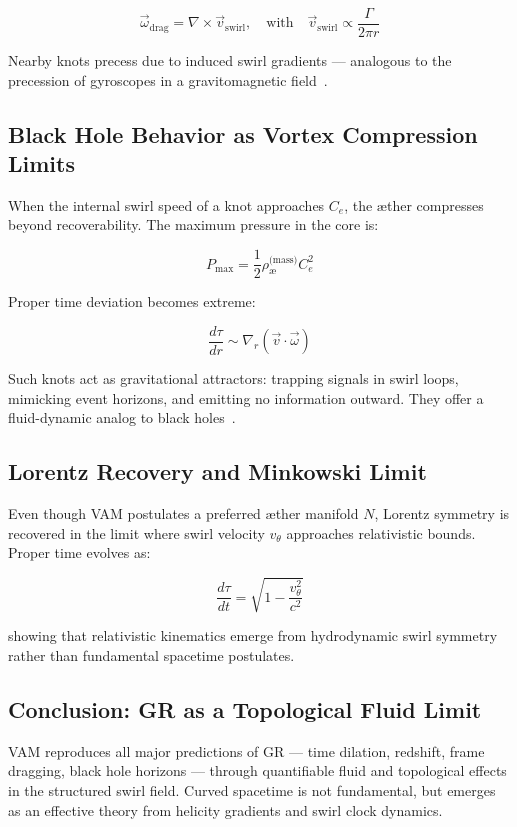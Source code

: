 \documentclass[preprint]{revtex4-2}
\begin{document}
    \begin{equation}
        \vec{\omega}_{\text{drag}} = \nabla \times \vec{v}_{\text{swirl}}, \quad \text{with} \quad \vec{v}_{\text{swirl}} \propto \frac{\Gamma}{2\pi r}
    \end{equation}

    Nearby knots precess due to induced swirl gradients — analogous to the precession of gyroscopes in a gravitomagnetic field~\cite{moffatt1969degree}.

    \subsection{Black Hole Behavior as Vortex Compression Limits}
    When the internal swirl speed of a knot approaches \( C_e \), the æther compresses beyond recoverability. The maximum pressure in the core is:

    \begin{equation}
        P_{\text{max}} = \frac{1}{2} \rho_{\text{\ae}}^{\text{(mass)}} C_e^2
    \end{equation}

    Proper time deviation becomes extreme:

    \begin{equation}
        \frac{d\tau}{dr} \sim \nabla_r (\vec{v} \cdot \vec{\omega})
    \end{equation}

    Such knots act as gravitational attractors: trapping signals in swirl loops, mimicking event horizons, and emitting no information outward. They offer a fluid-dynamic analog to black holes~\cite{volovik2003universe}.

    \subsection{Lorentz Recovery and Minkowski Limit}
    Even though VAM postulates a preferred æther manifold \( N \), Lorentz symmetry is recovered in the limit where swirl velocity \( v_\theta \) approaches relativistic bounds. Proper time evolves as:

    \begin{equation}
        \frac{d\tau}{dt} = \sqrt{1 - \frac{v_\theta^2}{c^2}}
    \end{equation}

    showing that relativistic kinematics emerge from hydrodynamic swirl symmetry rather than fundamental spacetime postulates.

    \subsection*{Conclusion: GR as a Topological Fluid Limit}
    VAM reproduces all major predictions of GR — time dilation, redshift, frame dragging, black hole horizons — through quantifiable fluid and topological effects in the structured swirl field. Curved spacetime is not fundamental, but emerges as an effective theory from helicity gradients and swirl clock dynamics.
\end{document}
